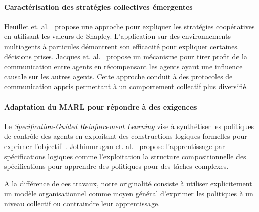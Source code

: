 \documentclass[demonstration]{jfsma}
\begin{document}
\paragraph{\textbf{Caractérisation des stratégies collectives émergentes}}
%
Heuillet et. al.~\cite{Heuillet2022} propose une approche pour expliquer les stratégies coopératives en utilisant les valeurs de Shapley. L'application sur des environnements multiagents à particules démontrent son efficacité pour expliquer certaines décisions prises.
%
Jacques et. al.~\cite{Jaques2019} propose un mécanisme pour tirer profit de la communication entre agents en récompensant les agents ayant une influence causale sur les autres agents. Cette approche conduit à des protocoles de communication appris permettant à un comportement collectif plus diversifié.

\paragraph{\textbf{Adaptation du MARL pour répondre à des exigences}}
%
%
Le \emph{Specification-Guided Reinforcement Learning} vise à synthétiser les politiques de contrôle des agents en exploitant des constructions logiques formelles pour exprimer l'objectif~\cite{Bansal2022}.%
%
Jothimurugan et. al.~\cite{Jothimurugan2021} propose l'apprentissage par spécifications logiques comme l'exploitation la structure compositionnelle des spécifications pour apprendre des politiques pour des tâches complexes.

A la différence de ces travaux, notre originalité consiste à utiliser explicitement un modèle organisationnel comme moyen général d'exprimer les politiques à un niveau collectif ou contraindre leur apprentissage. %


\end{document}
